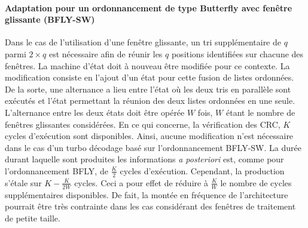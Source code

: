 \paragraph*{Adaptation pour un ordonnancement de type Butterfly avec fenêtre glissante (BFLY-SW)}
Dans le cas de l'utilisation d'une fenêtre glissante, %
un tri supplémentaire de $q$ parmi $2\times q$  est nécessaire afin de réunir les $q$ positions identifiées sur 
chacune des fenêtres. La machine d'état doit à nouveau être modifiée pour ce contexte. La modification consiste en 
l'ajout d'un état pour cette fusion de listes ordonnées. De la sorte, une alternance a lieu entre l'état où les deux tris en parallèle sont exécutés et l'état permettant la réunion des deux listes ordonnées en une seule. L'alternance entre les deux états doit être opérée $W$ fois, $W$ étant le nombre de fenêtres glissantes considérées.
En ce qui concerne, la vérification des CRC, $K$ cycles d'exécution sont disponibles. Ainsi, aucune modification n'est 
nécessaire dans le cas d'un turbo décodage basé sur l'ordonnancement BFLY-SW. La durée durant laquelle sont 
produites les informations \textit{a posteriori} est, comme pour 
l'ordonnancement BFLY, de $\frac{K}{2}$ cycles d'exécution. Cependant, la production s'étale sur $K-\frac{K}{2W}$ cycles. 
Ceci a pour effet de réduire à $\frac{K}{W}$ le nombre de cycles 
supplémentaires disponibles. De fait, la montée en fréquence de l'architecture pourrait être très contrainte dans les cas
considérant des fenêtres de traitement de petite taille.

